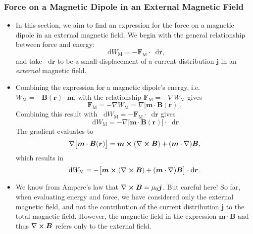 \documentclass[11pt, a4paper]{article}
\newcommand{\diff}{\mathop{}\!\mathrm{d}} %
\renewcommand{\vec}[1]{\bm{#1}} %
\renewcommand{\r}{\vec{r}}
\newcommand{\B}{\vec{B}} %
\newcommand{\mm}{\mu_{0}}  %
\newcommand{\m}{\vec{m}}  %
\renewcommand{\j}{\vec{j}}  %
\renewcommand{\curl}{\nabla \cross}
\renewcommand{\grad}{\nabla}
\begin{document}
\begin{itemize}
\end{itemize}



\subsubsection{Force on a Magnetic Dipole in an External Magnetic Field}
\begin{itemize}
	\item In this section, we aim to find an expression for the force on a magnetic dipole in an external magnetic field. We begin with the general relationship between force and energy:
	\begin{equation*}
		\diff W_{\text{M}} = - \vec{F}_{\text{M}} \cdot \diff \r,
	\end{equation*}
	and take $ \diff \r $ to be a small displacement of a current distribution $ \j $ in an \textit{external} magnetic field.
	
    \item Combining the expression for a magnetic dipole's energy, i.e. $ W_{\text{M}} = - \B(\r) \cdot \m $, with the relationship $ \vec{F}_{\text{M}} = - \grad W_{\text{M}}  $ gives
    \begin{equation*}
        \vec{F}_{\text{M}} = - \grad W_{\text{M}} = \grad \big[ \m \cdot \B(\r) \big].
    \end{equation*}
    Combining this result with $ \diff W_{\text{M}} = - \vec{F}_{\text{M}} \cdot \diff \r $ gives
	\begin{equation*}
		\diff W_{\text{M}} = - \grad\big[\m \cdot \B(\r)\big] \cdot \diff \r.
	\end{equation*}
	The gradient evaluates to 
	\begin{equation*}
		\grad\big[\m \cdot \B(\r)\big] = \m \cross (\curl \B) + (\m \cdot \grad)\B,
	\end{equation*}
    which results in
    \begin{equation*}
        \diff W_{\text{M}} = - \big[ \m \cross (\curl \B) + (\m \cdot \grad)\B \big] \cdot \diff \r.
    \end{equation*}
    
	\item We know from Ampere's law that $ \curl \B = \mm \j $. But careful here! So far, when evaluating energy and force, we have considered only the external magnetic field, and not the contribution of the current distribution $ \j $ to the total magnetic field. However, the magnetic field in the expression $ \m \cdot \B $ and thus $ \curl \B $ refers only to the external field.
	

\end{itemize}
\end{document}
